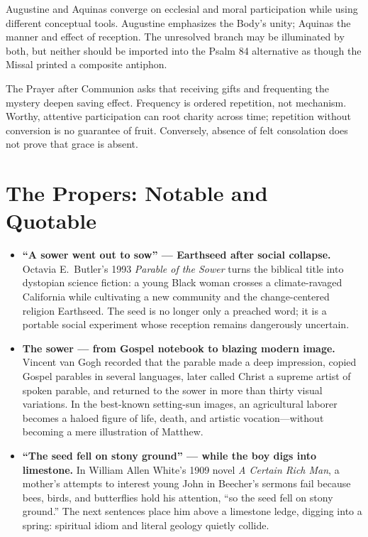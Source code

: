 \begin{deepstudy}
Augustine and Aquinas converge on ecclesial and moral participation while using different conceptual tools. Augustine emphasizes the Body's unity; Aquinas the manner and effect of reception. The unresolved branch may be illuminated by both, but neither should be imported into the Psalm 84 alternative as though the Missal printed a composite antiphon.

The Prayer after Communion asks that receiving gifts and frequenting the mystery deepen saving effect. Frequency is ordered repetition, not mechanism. Worthy, attentive participation can root charity across time; repetition without conversion is no guarantee of fruit. Conversely, absence of felt consolation does not prove that grace is absent.

\section*{The Propers: Notable and Quotable}

{\small
\begin{itemize}[itemsep=0em,topsep=0.15em,parsep=0pt]
\item \textbf{“A sower went out to sow” --- Earthseed after social collapse.\enspace{}} Octavia E.~Butler's 1993 \emph{Parable of the Sower} turns the biblical title into dystopian science fiction: a young Black woman crosses a climate-ravaged California while cultivating a new community and the change-centered religion Earthseed. The seed is no longer only a preached word; it is a portable social experiment whose reception remains dangerously uncertain.

\item \textbf{The sower --- from Gospel notebook to blazing modern image.\enspace{}} Vincent van Gogh recorded that the parable made a deep impression, copied Gospel parables in several languages, later called Christ a supreme artist of spoken parable, and returned to the sower in more than thirty visual variations. In the best-known setting-sun images, an agricultural laborer becomes a haloed figure of life, death, and artistic vocation---without becoming a mere illustration of Matthew.

\item \textbf{“The seed fell on stony ground” --- while the boy digs into limestone.\enspace{}} In William Allen White's 1909 novel \emph{A Certain Rich Man}, a mother's attempts to interest young John in Beecher's sermons fail because bees, birds, and butterflies hold his attention, “so the seed fell on stony ground.” The next sentences place him above a limestone ledge, digging into a spring: spiritual idiom and literal geology quietly collide.


\end{itemize}}
\end{deepstudy}
